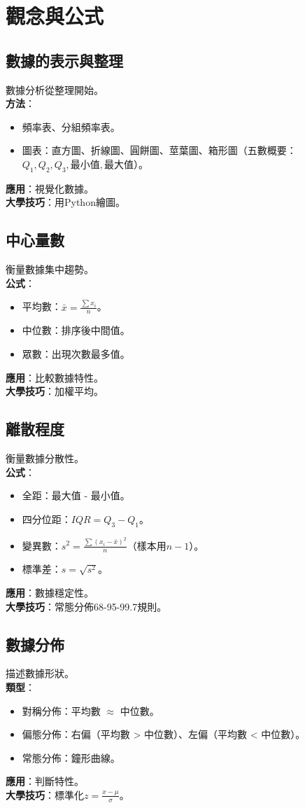 \section{觀念與公式}

\subsection{數據的表示與整理}
數據分析從整理開始。\\
\textbf{方法}：
\begin{itemize}
    \item 頻率表、分組頻率表。
    \item 圖表：直方圖、折線圖、圓餅圖、莖葉圖、箱形圖（五數概要：$Q_1, Q_2, Q_3, \text{最小值}, \text{最大值}$）。
\end{itemize}
\textbf{應用}：視覺化數據。\\
\textbf{大學技巧}：用Python繪圖。

\subsection{中心量數}
衡量數據集中趨勢。\\
\textbf{公式}：
\begin{itemize}
    \item 平均數：$\bar{x} = \frac{\sum x_i}{n}$。
    \item 中位數：排序後中間值。
    \item 眾數：出現次數最多值。
\end{itemize}
\textbf{應用}：比較數據特性。\\
\textbf{大學技巧}：加權平均。

\subsection{離散程度}
衡量數據分散性。\\
\textbf{公式}：
\begin{itemize}
    \item 全距：最大值 - 最小值。
    \item 四分位距：$IQR = Q_3 - Q_1$。
    \item 變異數：$s^2 = \frac{\sum (x_i - \bar{x})^2}{n}$（樣本用$n-1$）。
    \item 標準差：$s = \sqrt{s^2}$。
\end{itemize}
\textbf{應用}：數據穩定性。\\
\textbf{大學技巧}：常態分佈68-95-99.7規則。

\subsection{數據分佈}
描述數據形狀。\\
\textbf{類型}：
\begin{itemize}
    \item 對稱分佈：平均數 $\approx$ 中位數。
    \item 偏態分佈：右偏（平均數 > 中位數）、左偏（平均數 < 中位數）。
    \item 常態分佈：鐘形曲線。
\end{itemize}
\textbf{應用}：判斷特性。\\
\textbf{大學技巧}：標準化$z = \frac{x - \mu}{\sigma}$。

